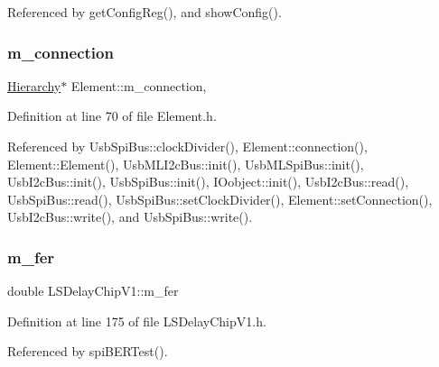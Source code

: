 Referenced by get\+Config\+Reg(), and show\+Config().

\mbox{\label{classElement_abe3de7a5dbbc9a6dd2d7e012e5fdb266}} 
\subsubsection{\texorpdfstring{m\+\_\+connection}{m\_connection}}
{\footnotesize\ttfamily \hyperlink{classHierarchy}{Hierarchy}$\ast$ Element\+::m\+\_\+connection\hspace{0.3cm}{\ttfamily [protected]}, {\ttfamily [inherited]}}



Definition at line 70 of file Element.\+h.



Referenced by Usb\+Spi\+Bus\+::clock\+Divider(), Element\+::connection(), Element\+::\+Element(), Usb\+M\+L\+I2c\+Bus\+::init(), Usb\+M\+L\+Spi\+Bus\+::init(), Usb\+I2c\+Bus\+::init(), Usb\+Spi\+Bus\+::init(), I\+Oobject\+::init(), Usb\+I2c\+Bus\+::read(), Usb\+Spi\+Bus\+::read(), Usb\+Spi\+Bus\+::set\+Clock\+Divider(), Element\+::set\+Connection(), Usb\+I2c\+Bus\+::write(), and Usb\+Spi\+Bus\+::write().

\mbox{\label{classLSDelayChipV1_a38d35de6a25fb1394ede2f39a4f25a08}} 
\subsubsection{\texorpdfstring{m\+\_\+fer}{m\_fer}}
{\footnotesize\ttfamily double L\+S\+Delay\+Chip\+V1\+::m\+\_\+fer\hspace{0.3cm}{\ttfamily [private]}}



Definition at line 175 of file L\+S\+Delay\+Chip\+V1.\+h.



Referenced by spi\+B\+E\+R\+Test().

\mbox{\label{classLSDelayChipV1_a425c69ef8f3d64d93cb1c86b83bbceec}} 
